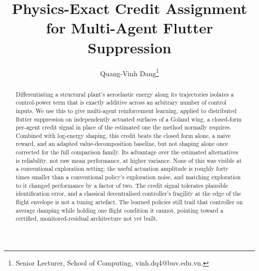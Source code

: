 \documentclass[journal]{new-aiaa}
\title{Physics-Exact Credit Assignment for Multi-Agent Flutter Suppression}
\author{Quang-Vinh Dang\footnote{Senior Lecturer, School of Computing, vinh.dq4@buv.edu.vn.}}
\affil{British University Vietnam, Hung Yen, Vietnam}
\begin{document}
\maketitle

\begin{abstract}
Differentiating a structural plant's aeroelastic energy along its
trajectories isolates a control-power term that is exactly additive across an
arbitrary number of control inputs. We use this to give multi-agent
reinforcement learning, applied to distributed flutter suppression on
independently actuated surfaces of a Goland wing, a closed-form per-agent
credit signal in place of the estimated one the method normally requires.
Combined with log-energy shaping, this credit beats the closed form alone, a
naive reward, and an adapted value-decomposition baseline, but not shaping
alone once corrected for the full comparison family. Its advantage over the
estimated alternatives is reliability, not raw mean performance, at higher
variance. None of this was visible at a conventional exploration setting:
the useful actuation amplitude is roughly forty times smaller than a
conventional policy's exploration noise, and matching exploration to it
changed performance by a factor of two. The credit signal tolerates
plausible identification error, and a classical decentralised controller's
fragility at the edge of the flight envelope is not a tuning artefact. The
learned policies still trail that controller on average damping while
holding one flight condition it cannot, pointing toward a certified,
monitored-residual architecture not yet built.
\end{abstract}
\end{document}
